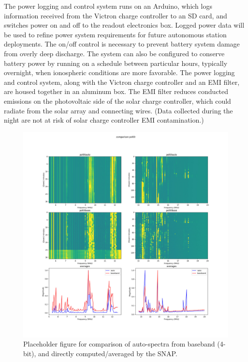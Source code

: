 \documentclass{ws-jai}
\begin{document}
The power logging and control system runs on an Arduino, which logs
information received from the Victron charge controller to an SD card,
and switches power on and off to the readout electronics box. Logged
power data will be used to refine power system requirements for future
autonomous station deployments. The on/off control is necessary to
prevent battery system damage from overly deep discharge. The system
can also be configured to conserve battery power by running on a
schedule between particular hours, typically overnight, when
ionospheric conditions are more favorable.  The power logging and
control system, along with the Victron charge controller and an EMI
filter, are housed together in an aluminum box. The EMI filter reduces
conducted emissions on the photovoltaic side of the solar charge
controller, which could radiate from the solar array and connecting
wires. (Data collected during the night are not at risk of solar
charge controller EMI contamination.)

\begin{figure}[t]
  \begin{center}
    \includegraphics[width=0.8\linewidth]{Figures/baseband_direct_auto_compare.jpg}
    \caption{Placeholder figure for comparison of auto-spectra from
      baseband (4-bit), and directly computed/averaged by the SNAP.}
    \label{Fig:baseband_direct_auto}
  \end{center}
\end{figure}
\end{document}
